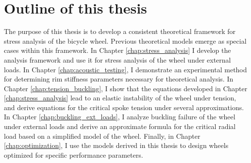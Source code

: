 \documentclass[../thesis.tex]{subfiles}
\begin{document}
\section{Outline of this thesis}

The purpose of this thesis is to develop a consistent theoretical framework for stress analysis of the bicycle wheel. Previous theoretical models emerge as special cases within this framework. In Chapter \ref{chap:stress_analysis} I develop the analysis framework and use it for stress analysis of the wheel under external loads. In Chapter \ref{chap:acoustic_testing}, I demonstrate an experimental method for determining rim stiffness parameters necessary for theoretical analysis. In Chapter \ref{chap:tension_buckling}, I show that the equations developed in Chapter \ref{chap:stress_analysis} lead to an elastic instability of the wheel under tension, and derive equations for the critical spoke tension under several approximations. In Chapter \ref{chap:buckling_ext_loads}, I analyze buckling failure of the wheel under external loads and derive an approximate formula for the critical radial load based on a simplified model of the wheel. Finally, in Chapter \ref{chap:optimization}, I use the models derived in this thesis to design wheels optimized for specific performance parameters.
\end{document}
